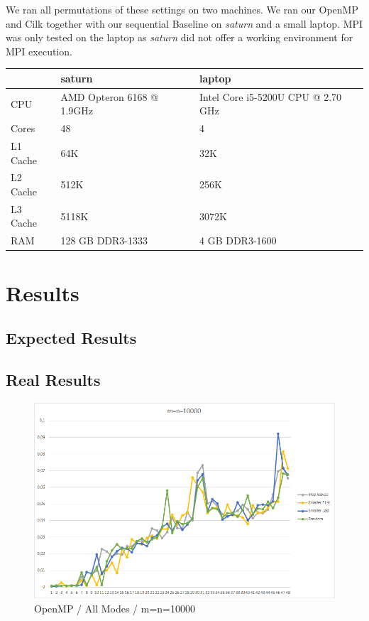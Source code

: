 \documentclass[12pt,a4paper,titlepage,oneside]{scrartcl}
\begin{document}
We ran all permutations of these settings on two machines. We ran our OpenMP and Cilk together with our sequential Baseline on \textit{saturn} and a small laptop. MPI was only tested on the laptop as \textit{saturn} did not offer a working environment for MPI execution.

\begin{center}
\begin{tabular}{ l | l | l }
\hline
 & saturn & laptop \\ \hline
CPU & AMD Opteron 6168 @ 1.9GHz & Intel Core i5-5200U CPU @ 2.70 GHz \\ \hline
Cores & 48 & 4 \\ \hline
L1 Cache & 64K & 32K \\ \hline
L2 Cache & 512K & 256K \\ \hline
L3 Cache & 5118K & 3072K \\ \hline
RAM & 128 GB DDR3-1333 & 4 GB DDR3-1600 \\ \hline
\end{tabular}
\end{center}

\section{Results}


\subsection{Expected Results}



\subsection{Real Results}

\begin{figure}[h]
\includegraphics[width=\linewidth]{Saturn_OpenMP_10000}
\caption{OpenMP / All Modes / m=n=10000}
\end{figure}
\end{document}
